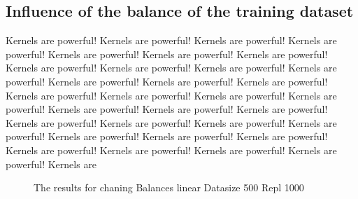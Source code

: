 \documentclass[a4paper]{article}
\begin{document}
\subsection{Influence of the balance of the training dataset}


 Kernels are powerful! Kernels are powerful! Kernels are powerful! Kernels are powerful! Kernels are powerful! Kernels are powerful! Kernels are powerful! Kernels are powerful! Kernels are powerful! Kernels are powerful! Kernels are powerful! Kernels are powerful! Kernels are powerful! Kernels are powerful! Kernels are powerful! Kernels are powerful! Kernels are powerful! Kernels are powerful! Kernels are powerful! Kernels are powerful! Kernels are powerful! Kernels are powerful! Kernels are powerful! Kernels are powerful! Kernels are powerful! Kernels are powerful! Kernels are powerful! Kernels are powerful! Kernels are powerful! Kernels are powerful! Kernels are powerful! Kernels are powerful! Kernels are 

\begin{figure}[!htb]
\begin{center}

\caption{The results for chaning Balances linear Datasize 500 Repl 1000}
\label{fig1}
\end{center}
\end{figure}
\end{document}
